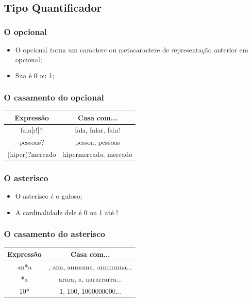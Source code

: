 \subsection{Tipo Quantificador}


\begin{frame}
	\frametitle{O opcional}
	\begin{itemize}
		\item O opcional torna um caractere ou metacaractere de representação anterior em opcional;
		\item Sua  é 0 ou 1;
	\end{itemize}
\end{frame}

\begin{frame}
	\frametitle{O casamento do opcional}
	
	\begin{center}
	\begin{tabular}{c | c}
		\textbf{Expressão} 	& \textbf{Casa com...} \\ \hline
		fala[r!]?		& fala, falar, fala! 	\\ \hline
		pessoas?		& pessoa, pessoas 	\\ \hline
		(hiper)?mercado		& hipermercado, mercado \\ \hline
	\end{tabular}
	\end{center}
\end{frame}


\begin{frame}
	\frametitle{O asterisco}
	\begin{itemize}
		\item O asterisco é o guloso;
		\item A cardinalidade dele é 0 ou 1 até !
	\end{itemize}
\end{frame}

\begin{frame}
	\frametitle{O casamento do asterisco}
	
	\begin{center}
	\begin{tabular}{c | c}
		\textbf{Expressão} 	& \textbf{Casa com...} \\ \hline
		an*a			& , ana, annnnna, annnnnna... 	\\ \hline
		[ar]*a			& arara, a, aararrarra... 	\\ \hline
		10*			& 1, 100, 1000000000... \\ \hline
	\end{tabular}
	\end{center}
\end{frame}

